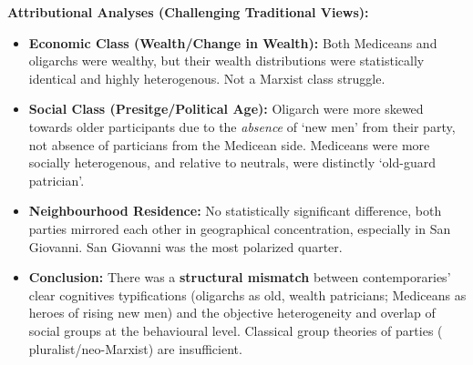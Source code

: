 \documentclass{article}
\begin{document}
    \noindent \textbf{Attributional Analyses (Challenging Traditional Views):}
    \begin{itemize}
        \item \textbf{Economic Class (Wealth/Change in Wealth):} Both
        Mediceans and oligarchs were wealthy, but their wealth distributions
        were statistically identical and highly heterogenous. Not a Marxist
        class struggle.
        \item \textbf{Social Class (Presitge/Political Age):} Oligarch were
        more skewed towards older participants due to the \textit{absence}
        of `new men' from their party, not absence of particians from the
        Medicean side. Mediceans were more socially heterogenous, and
        relative to neutrals, were distinctly `old-guard patrician'.
        \item \textbf{Neighbourhood Residence:} No statistically significant
        difference, both parties mirrored each other in geographical
        concentration, especially in San Giovanni. San Giovanni was the most
        polarized quarter.
        \item \textbf{Conclusion:} There was a \textbf{structural mismatch}
        between contemporaries' clear cognitives typifications (oligarchs as
        old, wealth patricians; Mediceans as heroes of rising new men) and
        the objective heterogeneity and overlap of social groups at the
        behavioural level. Classical group theories of parties (
        pluralist/neo-Marxist) are insufficient.
    \end{itemize}
\end{document}
